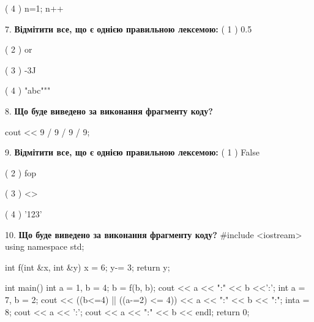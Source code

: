 \documentclass[11pt]{article}
\begin{document}
( 4 ) n=1; n++
\par\vspace{5mm}

7. %
\textbf{Відмітити все, що є однією правильною лексемою:}
( 1 ) 0.5

( 2 ) or

( 3 ) -3J

( 4 ) "abc"""
\par\vspace{5mm}

8. \textbf{Що буде виведено за виконання фрагменту коду?}

cout << 9 / 9 / 9 / 9;
\par\vspace{5mm}

9. %
\textbf{Відмітити все, що є однією правильною лексемою:}
( 1 ) False

( 2 ) fop

( 3 ) <>

( 4 ) '123'
\par\vspace{5mm}

10. \textbf{Що буде виведено за виконання фрагменту коду?}
#include <iostream>
using namespace std;

int f(int &x, int &y){
    x = 6;
    y-= 3;
    return y;
}

int main(){
    int a = 1, b = 4;
    b = f(b, b);
    cout << a << ":" << b <<':';
    {
        int a = 7, b = 2;
        cout << ((b<=4) || ((a-=2) <= 4))
             << a << ":" << b << ":";
    }
    {
        inta = 8;
        cout << a << ':';
    }
    cout << a << ":" << b << endl;
    return 0;
}

\par\vspace{5mm}

\newpage
\end{document}

